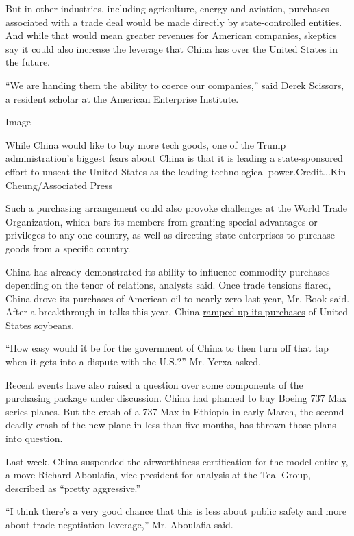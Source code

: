 But in other industries, including agriculture, energy and aviation,
purchases associated with a trade deal would be made directly by
state-controlled entities. And while that would mean greater revenues
for American companies, skeptics say it could also increase the leverage
that China has over the United States in the future.

``We are handing them the ability to coerce our companies,'' said Derek
Scissors, a resident scholar at the American Enterprise Institute.

Image

While China would like to buy more tech goods, one of the Trump
administration's biggest fears about China is that it is leading a
state-sponsored effort to unseat the United States as the leading
technological power.Credit...Kin Cheung/Associated Press

Such a purchasing arrangement could also provoke challenges at the World
Trade Organization, which bars its members from granting special
advantages or privileges to any one country, as well as directing state
enterprises to purchase goods from a specific country.

China has already demonstrated its ability to influence commodity
purchases depending on the tenor of relations, analysts said. Once trade
tensions flared, China drove its purchases of American oil to nearly
zero last year, Mr. Book said. After a breakthrough in talks this year,
China
\href{https://www.nytimes.com/2019/02/02/business/china-us-soybeans.html}{ramped
up its purchases} of United States soybeans.

``How easy would it be for the government of China to then turn off that
tap when it gets into a dispute with the U.S.?'' Mr. Yerxa asked.

Recent events have also raised a question over some components of the
purchasing package under discussion. China had planned to buy Boeing 737
Max series planes. But the crash of a 737 Max in Ethiopia in early
March, the second deadly crash of the new plane in less than five
months, has thrown those plans into question.

Last week, China suspended the airworthiness certification for the model
entirely, a move Richard Aboulafia, vice president for analysis at the
Teal Group, described as ``pretty aggressive.''

``I think there's a very good chance that this is less about public
safety and more about trade negotiation leverage,'' Mr. Aboulafia said.

